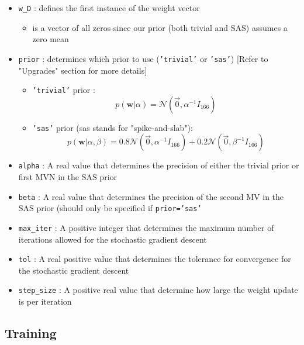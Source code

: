 \documentclass[12pt]{article}
\begin{document}
\begin{itemize}
\item \texttt{w\_D} : defines the first instance of the weight vector

	\begin{itemize}
	\item is a vector of all zeros since our prior (both trivial and SAS) assumes a zero mean
	\end{itemize}
	
\item \texttt{prior} : determines which prior to use (\texttt{'trivial'} or \texttt{'sas'}) [Refer to "Upgrades" section for more details]

	\begin{itemize}
	\item \texttt{'trivial'} prior :
\begin{equation}
p(\textbf{w}|\alpha) = \mathcal{N}(\vec{0}, 	\alpha^{-1}I_{166})
\end{equation}
	\item \texttt{'sas'} prior (sas stands for "spike-and-slab"):
\begin{equation}
p(\textbf{w}|\alpha,\beta) = 0.8\mathcal{N}(\vec{0}, 	\alpha^{-1}I_{166}) + 0.2\mathcal{N}(\vec{0}, 	\beta^{-1}I_{166})
\end{equation}
	\end{itemize}

\item \texttt{alpha} : A real value that determines the precision of either the trivial prior or first MVN in the SAS prior

\item \texttt{beta} : A real value that determines the precision of the second MV in the SAS prior (should only be specified if \texttt{prior='sas'}

\item \texttt{max\_iter} : A positive integer that determines the maximum number of iterations allowed for the stochastic gradient descent

\item \texttt{tol} : A real positive value that determines the tolerance for convergence for the stochastic gradient descent

\item \texttt{step\_size} : A positive real value that determine how large the weight update is per iteration

\end{itemize}

\subsection{Training}
\end{document}
